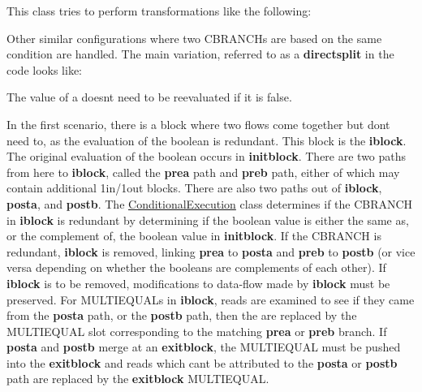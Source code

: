 This class tries to perform transformations like the following\+: 
\begin{DoxyCode}{0}
\DoxyCodeLine{\}                  \}}
\end{DoxyCode}
 Other similar configurations where two C\+B\+R\+A\+N\+C\+Hs are based on the same condition are handled. The main variation, referred to as a {\bfseries{directsplit}} in the code looks like\+: 
\begin{DoxyCode}{0}
\DoxyCodeLine{\}                             \}}
\end{DoxyCode}
 The value of \textquotesingle{}a\textquotesingle{} doesn\textquotesingle{}t need to be reevaluated if it is false.

In the first scenario, there is a block where two flows come together but don\textquotesingle{}t need to, as the evaluation of the boolean is redundant. This block is the {\bfseries{iblock}}. The original evaluation of the boolean occurs in {\bfseries{initblock}}. There are two paths from here to {\bfseries{iblock}}, called the {\bfseries{prea}} path and {\bfseries{preb}} path, either of which may contain additional 1in/1out blocks. There are also two paths out of {\bfseries{iblock}}, {\bfseries{posta}}, and {\bfseries{postb}}. The \mbox{\hyperlink{class_conditional_execution}{Conditional\+Execution}} class determines if the C\+B\+R\+A\+N\+CH in {\bfseries{iblock}} is redundant by determining if the boolean value is either the same as, or the complement of, the boolean value in {\bfseries{initblock}}. If the C\+B\+R\+A\+N\+CH is redundant, {\bfseries{iblock}} is removed, linking {\bfseries{prea}} to {\bfseries{posta}} and {\bfseries{preb}} to {\bfseries{postb}} (or vice versa depending on whether the booleans are complements of each other). If {\bfseries{iblock}} is to be removed, modifications to data-\/flow made by {\bfseries{iblock}} must be preserved. For M\+U\+L\+T\+I\+E\+Q\+U\+A\+Ls in {\bfseries{iblock}}, reads are examined to see if they came from the {\bfseries{posta}} path, or the {\bfseries{postb}} path, then the are replaced by the M\+U\+L\+T\+I\+E\+Q\+U\+AL slot corresponding to the matching {\bfseries{prea}} or {\bfseries{preb}} branch. If {\bfseries{posta}} and {\bfseries{postb}} merge at an {\bfseries{exitblock}}, the M\+U\+L\+T\+I\+E\+Q\+U\+AL must be pushed into the {\bfseries{exitblock}} and reads which can\textquotesingle{}t be attributed to the {\bfseries{posta}} or {\bfseries{postb}} path are replaced by the {\bfseries{exitblock}} M\+U\+L\+T\+I\+E\+Q\+U\+AL.

